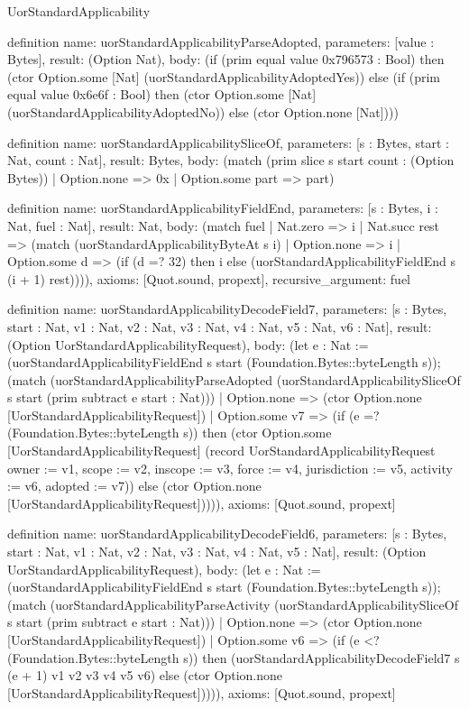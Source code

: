 \begin{lexlean}{UorStandardApplicability}
\begin{semanticmodule}
definition{
  name: uorStandardApplicabilityParseAdopted,
  parameters: [value : Bytes],
  result: (Option Nat),
  body: (if (prim equal value 0x796573 : Bool) then (ctor Option.some [Nat] (uorStandardApplicabilityAdoptedYes)) else (if (prim equal value 0x6e6f : Bool) then (ctor Option.some [Nat] (uorStandardApplicabilityAdoptedNo)) else (ctor Option.none [Nat])))
}

definition{
  name: uorStandardApplicabilitySliceOf,
  parameters: [s : Bytes, start : Nat, count : Nat],
  result: Bytes,
  body: (match (prim slice s start count : (Option Bytes))
    | Option.none => 0x
    | Option.some part => part)
}

definition{
  name: uorStandardApplicabilityFieldEnd,
  parameters: [s : Bytes, i : Nat, fuel : Nat],
  result: Nat,
  body: (match fuel
    | Nat.zero => i
    | Nat.succ rest => (match (uorStandardApplicabilityByteAt s i)
      | Option.none => i
      | Option.some d => (if (d =? 32) then i else (uorStandardApplicabilityFieldEnd s (i + 1) rest)))),
  axioms: [Quot.sound, propext],
  recursive_argument: fuel
}

definition{
  name: uorStandardApplicabilityDecodeField7,
  parameters: [s : Bytes, start : Nat, v1 : Nat, v2 : Nat, v3 : Nat, v4 : Nat, v5 : Nat, v6 : Nat],
  result: (Option UorStandardApplicabilityRequest),
  body: (let e : Nat := (uorStandardApplicabilityFieldEnd s start (Foundation.Bytes::byteLength s)); (match (uorStandardApplicabilityParseAdopted (uorStandardApplicabilitySliceOf s start (prim subtract e start : Nat)))
    | Option.none => (ctor Option.none [UorStandardApplicabilityRequest])
    | Option.some v7 => (if (e =? (Foundation.Bytes::byteLength s)) then (ctor Option.some [UorStandardApplicabilityRequest] (record UorStandardApplicabilityRequest {owner := v1, scope := v2, inscope := v3, force := v4, jurisdiction := v5, activity := v6, adopted := v7})) else (ctor Option.none [UorStandardApplicabilityRequest])))),
  axioms: [Quot.sound, propext]
}

definition{
  name: uorStandardApplicabilityDecodeField6,
  parameters: [s : Bytes, start : Nat, v1 : Nat, v2 : Nat, v3 : Nat, v4 : Nat, v5 : Nat],
  result: (Option UorStandardApplicabilityRequest),
  body: (let e : Nat := (uorStandardApplicabilityFieldEnd s start (Foundation.Bytes::byteLength s)); (match (uorStandardApplicabilityParseActivity (uorStandardApplicabilitySliceOf s start (prim subtract e start : Nat)))
    | Option.none => (ctor Option.none [UorStandardApplicabilityRequest])
    | Option.some v6 => (if (e <? (Foundation.Bytes::byteLength s)) then (uorStandardApplicabilityDecodeField7 s (e + 1) v1 v2 v3 v4 v5 v6) else (ctor Option.none [UorStandardApplicabilityRequest])))),
  axioms: [Quot.sound, propext]
}


\end{semanticmodule}
\end{lexlean}
